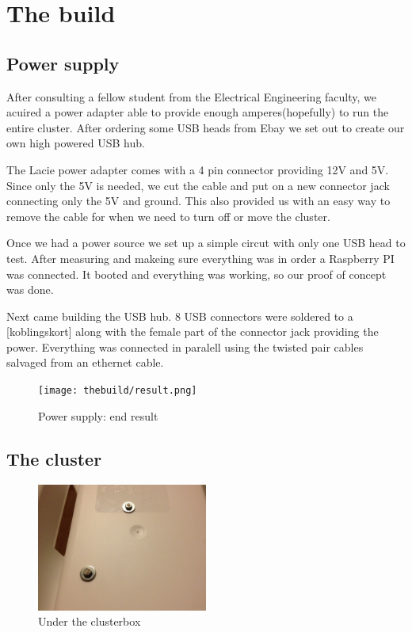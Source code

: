 \clearpage
\section{The build}
\subsection{Power supply}
After consulting a fellow student from the Electrical Engineering faculty, we acuired a power adapter able to provide enough amperes(hopefully) to run the entire cluster. After ordering some USB heads from Ebay we set out to create our own high powered USB hub. 

The Lacie power adapter comes with a 4 pin connector providing 12V and 5V. Since only the 5V is needed, we cut the cable and put on a new connector jack connecting only the 5V and ground. This also provided us with an easy way to remove the cable for when we need to turn off or move the cluster. 

Once we had a power source we set up a simple circut with only one USB head to test. After measuring and makeing sure everything was in order a Raspberry PI was connected. It booted and everything was working, so our proof of concept was done.  

Next came building the USB hub. 8 USB connectors were soldered to a [koblingskort] along with the female part of the connector jack providing the power. Everything was connected in paralell using the twisted pair cables salvaged from an ethernet cable.  

\begin{figure}[h]
	\centering
    \texttt{[image: thebuild/result.png]}
    \caption{Power supply: end result}
    \label{fig:build_power_supply}
\end{figure}

\subsection{The cluster}

\begin{figure}[h]
	\centering
    \includegraphics[width=0.5\textwidth]{thebuild/cluster_under.jpg}
    \caption{Under the clusterbox}
    \label{fig:build_cluster_under}
\end{figure}

